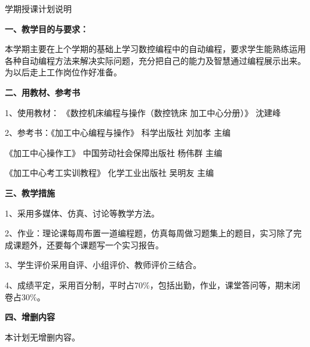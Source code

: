 \documentclass{ctexart}
\begin{document}

\jhsy %

\begin{center}
	 \heiti 学期授课计划说明
\end{center}
 \setlength{\parindent}{2em} \setlength{\baselineskip}{22pt}

\textbf{一、教学目的与要求：}

本学期主要在上个学期的基础上学习数控编程中的自动编程，要求学生能熟练运用各种自动编程方法来解决实际问题，充分把自己的能力及智慧通过编程展示出来。为以后走上工作岗位作好准备。

\textbf{二、用教材、参考书}

1、使用教材： 《数控机床编程与操作（数控铣床 加工中心分册）》 沈建峰

2、参考书：《加工中心编程与操作》  科学出版社  刘加孝   主编

\hspace{5em}《加工中心操作工》 中国劳动社会保障出版社  杨伟群  主编

\hspace{5em}《加工中心考工实训教程》  化学工业出版社   吴明友 主编

\textbf{三、教学措施}

1、采用多媒体、仿真、讨论等教学方法。

2、作业：理论课每周布置一道编程题，仿真每周做习题集上的题目，实习除了完成课题外，还要每个课题写一个实习报告。

3、学生评价采用自评、小组评价、教师评价三结合。

4、成绩平定，采用百分制，平时占70\%，包括出勤，作业，课堂答问等，期末闭卷占30\%。

\textbf{四、增删内容}

本计划无增删内容。
\end{document}
